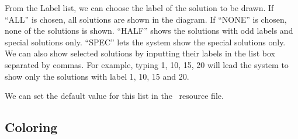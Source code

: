 From the Label list, we can choose the label of the solution to be drawn. If ``ALL'' is chosen, all 
solutions are shown in the diagram. If ``NONE'' is chosen, none of the solutions is shown.
``HALF'' shows the solutions with odd labels and special solutions only. ``SPEC'' lets the system
show the special solutions only.
We can also show selected solutions by inputting their labels in the list
box separated by commas. 
For example, typing 1, 10, 15, 20 will lead the system to show only the solutions with label 1, 10, 15 and 20. 

We can set the default value for this list in the \PLAUT~resource file.

\subsection{Coloring}

